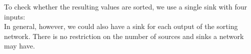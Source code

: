 %

To check whether the resulting values are sorted, we use a single sink with four inputs:
%
\\
%
In general, however, we could also have a sink for each output of the sorting network. There is no restriction on the number of sources and sinks a network may have.
